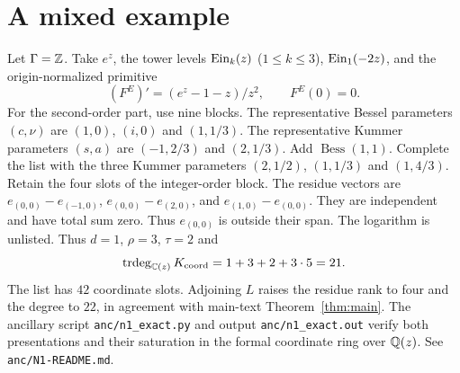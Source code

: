 \section{A mixed example}\label{sup:mixed-example}

Let $\Gamma=\mathbb{Z}$. Take $e^z$, the tower levels
$\operatorname{Ein}_k(z)$ ($1\le k\le3$), $\operatorname{Ein}_1(-2z)$, and the
origin-normalized primitive
\[
 (F^E)'=(e^z-1-z)/z^2,\qquad F^E(0)=0.
\]
For the second-order part, use nine blocks. The representative Bessel parameters $(c,\nu)$ are
$(1,0)$, $(i,0)$ and $(1,1/3)$. The representative Kummer parameters
$(s,a)$ are $(-1,2/3)$ and $(2,1/3)$. Add $\operatorname{Bess}(1,1)$.
Complete the list with the three Kummer parameters $(2,1/2)$, $(1,1/3)$ and $(1,4/3)$.
Retain the four slots of the integer-order block.
The residue vectors are $e_{(0,0)}-e_{(-1,0)}$,
$e_{(0,0)}-e_{(2,0)}$, and $e_{(1,0)}-e_{(0,0)}$.
They are independent and have total sum zero. Thus $e_{(0,0)}$ is outside
their span. The logarithm is unlisted. Thus $d=1$, $\rho=3$, $\tau=2$ and
\begin{equation}\label{eq:mixed-example-degree}
 \operatorname{trdeg}_{\mathbb{C}(z)}K_{\rm coord}=1+3+2+3\cdot5=21.
\end{equation}
The list has $42$ coordinate slots. Adjoining $L$ raises the residue rank to
four and the degree to $22$, in agreement with main-text Theorem~\ref{thm:main}.
The ancillary script \texttt{anc/n1\_exact.py} and output
\texttt{anc/n1\_exact.out} verify both presentations and their saturation
in the formal coordinate ring over $\mathbb{Q}(z)$. See \texttt{anc/N1-README.md}.
